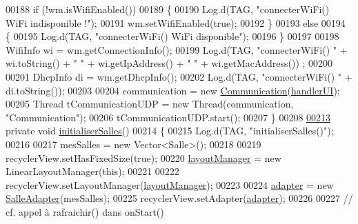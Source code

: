 \begin{DoxyCode}
00188         \textcolor{keywordflow}{if} (!wm.isWifiEnabled())
00189         \{
00190             Log.d(TAG, \textcolor{stringliteral}{"connecterWiFi() WiFi indisponible !"});
00191             wm.setWifiEnabled(\textcolor{keyword}{true});
00192         \}
00193         \textcolor{keywordflow}{else}
00194         \{
00195             Log.d(TAG, \textcolor{stringliteral}{"connecterWiFi() WiFi disponible"});
00196         \}
00197 
00198         WifiInfo wi = wm.getConnectionInfo();
00199         Log.d(TAG, \textcolor{stringliteral}{"connecterWiFi() "} + wi.toString() + \textcolor{stringliteral}{" "} + wi.getIpAddress() + \textcolor{stringliteral}{" "} + wi.getMacAddress())
      ;
00200 
00201         DhcpInfo di = wm.getDhcpInfo();
00202         Log.d(TAG, \textcolor{stringliteral}{"connecterWiFi() "} + di.toString());
00203 
00204         communication = \textcolor{keyword}{new} \hyperlink{classcom_1_1lasalle_1_1meeting_1_1_communication}{Communication}(\hyperlink{classcom_1_1lasalle_1_1meeting_1_1_main_activity_a7cf3c4cd95f0f7cb43c077937f80ab8c}{handlerUI});
00205         Thread tCommunicationUDP = \textcolor{keyword}{new} Thread(communication, \textcolor{stringliteral}{"Communication"});
00206         tCommunicationUDP.start();
00207     \}
00208 
\hyperlink{classcom_1_1lasalle_1_1meeting_1_1_main_activity_a9be385d267f1d26e32c21d119bc65343}{00213}     \textcolor{keyword}{private} \textcolor{keywordtype}{void} \hyperlink{classcom_1_1lasalle_1_1meeting_1_1_main_activity_a9be385d267f1d26e32c21d119bc65343}{initialiserSalles}()
00214     \{
00215         Log.d(TAG, \textcolor{stringliteral}{"initialiserSalles()"});
00216 
00217         mesSalles = \textcolor{keyword}{new} Vector<Salle>();
00218 
00219         recyclerView.setHasFixedSize(\textcolor{keyword}{true});
00220         \hyperlink{classcom_1_1lasalle_1_1meeting_1_1_main_activity_aab6810c357c5c87b60466bd82b691f98}{layoutManager} = \textcolor{keyword}{new} LinearLayoutManager(\textcolor{keyword}{this});
00221 
00222         recyclerView.setLayoutManager(\hyperlink{classcom_1_1lasalle_1_1meeting_1_1_main_activity_aab6810c357c5c87b60466bd82b691f98}{layoutManager});
00223 
00224         \hyperlink{classcom_1_1lasalle_1_1meeting_1_1_main_activity_ac0af1346d6f4b3b4bd549b324c0523cc}{adapter} = \textcolor{keyword}{new} \hyperlink{classcom_1_1lasalle_1_1meeting_1_1_salle_adapter}{SalleAdapter}(mesSalles);
00225         recyclerView.setAdapter(\hyperlink{classcom_1_1lasalle_1_1meeting_1_1_main_activity_ac0af1346d6f4b3b4bd549b324c0523cc}{adapter});
00226 
00227         \textcolor{comment}{// cf. appel à rafraichir() dans onStart()}

\end{DoxyCode}
